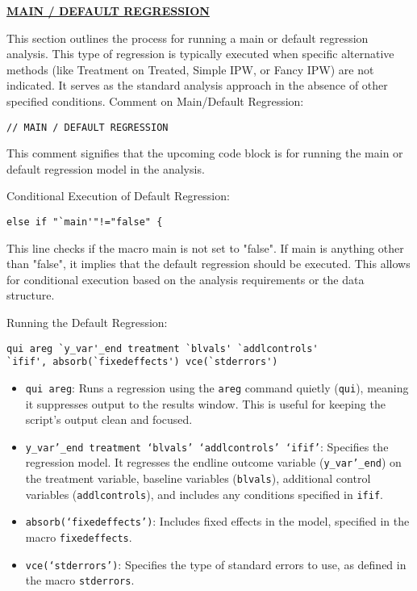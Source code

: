 \documentclass{article}
\begin{document}
\underline{\textbf{MAIN / DEFAULT REGRESSION}}


\vspace{0.2cm}This section outlines the process for running a main or default regression analysis. This type of regression is typically executed when specific alternative methods (like Treatment on Treated, Simple IPW, or Fancy IPW) are not indicated. It serves as the standard analysis approach in the absence of other specified conditions.\newline
Comment on Main/Default Regression:

\begin{mdframed}
\begin{verbatim}
// MAIN / DEFAULT REGRESSION
\end{verbatim}
\end{mdframed}
\vspace{0.3cm}This comment signifies that the upcoming code block is for running the main or default regression model in the analysis.\newline



Conditional Execution of Default Regression:
\begin{mdframed}
\begin{verbatim}
else if "`main'"!="false" {
\end{verbatim}
\end{mdframed}
\vspace{0.2cm}
This line checks if the macro main is not set to "false". If main is anything other than "false", it implies that the default regression should be executed. This allows for conditional execution based on the analysis requirements or the data structure.\newline

Running the Default Regression:
\begin{mdframed}
\begin{verbatim}
qui areg `y_var'_end treatment `blvals' `addlcontrols' 
`ifif', absorb(`fixedeffects') vce(`stderrors')
\end{verbatim}
\end{mdframed}

\begin{itemize}
    \item \texttt{qui areg}: Runs a regression using the \texttt{areg} command quietly (\texttt{qui}), meaning it suppresses output to the results window. This is useful for keeping the script's output clean and focused.
    \item \texttt{y\_var'\_end treatment `blvals' `addlcontrols' `ifif'}: Specifies the regression model. It regresses the endline outcome variable (\texttt{y\_var'\_end}) on the treatment variable, baseline variables (\texttt{blvals}), additional control variables (\texttt{addlcontrols}), and includes any conditions specified in \texttt{ifif}.
    \item \texttt{absorb(`fixedeffects')}: Includes fixed effects in the model, specified in the macro \texttt{fixedeffects}.
	\item \texttt{vce(`stderrors')}: Specifies the type of standard errors to use, as defined in the macro \texttt{stderrors}.
\end{itemize}
\end{document}
